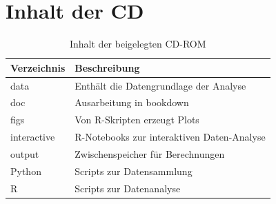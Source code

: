 \documentclass[11pt,a4paper,twoside]{article}
\let\oldpb\printbibliography
\renewcommand{\printbibliography}{\oldpb[heading=bibintoc,title=Referenzen]}
\begin{document}
\clearpage

\hypertarget{inhalt-der-cd}{%
\section{Inhalt der CD}\label{inhalt-der-cd}}



\begin{table}[!h]

\caption{\label{tab:app-cd}Inhalt der beigelegten CD-ROM}
\centering
\begin{tabular}[t]{ll}
\toprule
Verzeichnis & Beschreibung\\
\midrule
data & Enthält die Datengrundlage der Analyse\\
doc & Ausarbeitung in bookdown\\
figs & Von R-Skripten erzeugt Plots\\
interactive & R-Notebooks zur interaktiven Daten-Analyse\\
output & Zwischenspeicher für Berechnungen\\
\addlinespace
Python & Scripts zur Datensammlung\\
R & Scripts zur Datenanalyse\\
\bottomrule
\end{tabular}
\end{table}

\cleardoublepage

\printbibliography
\end{document}
